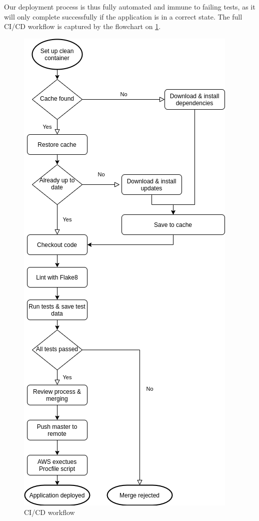 \documentclass[main.tex]{subfiles}
\begin{document}
Our deployment process is thus fully automated and immune to failing tests, as it will only complete successfully if the application is in a correct state. The full CI/CD workflow is captured by the flowchart on \figurename{\ref{CI_CD}}.

 \begin{figure}[H]
   \centering
   \includegraphics[scale=0.6]{05Coding/05Pictures/CI_CD.png}
   \caption{CI/CD workflow}
   \label{CI_CD}
\end{figure}
\end{document}
